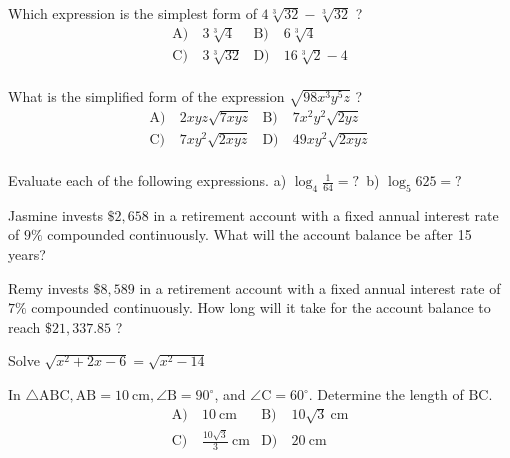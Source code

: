 \begin{problem}\label{Alg2-32}
 Which expression is the simplest form of $4 \sqrt[3]{32}-\sqrt[3]{32}$ ?
\begin{align*}
\text{A)}\ & 3 \sqrt[3]{4} &
\text{B)}\ &  6 \sqrt[3]{4}\\
\text{C)}\ & 3 \sqrt[3]{32} &
\text{D)}\ & 16 \sqrt[3]{2}-4\\
\end{align*}    
\end{problem}


\begin{problem}\label{Alg2-33}
What is the simplified form of the expression $\sqrt{98 x^{3} y^{5} z}$ ?
\begin{align*}
\text{A)}\ & 2 x y z \sqrt{7 x y z} &
\text{B)}\ &  7 x^{2} y^{2} \sqrt{2 y z}
\\
\text{C)}\ & 7 x y^{2} \sqrt{2 x y z}  &
\text{D)}\ &49 x y^{2} \sqrt{2 x y z} \\
\end{align*}    
\end{problem}



\begin{problem}\label{Alg2-37}
Evaluate each of the following expressions.
a) $\log _{4} \frac{1}{64}=? $\ 
b) $\log _{5} 625=? $
\end{problem}



\begin{problem}\label{Alg2-41}
Jasmine invests $\$ 2,658$ in a retirement account with a fixed annual interest rate of $9 \%$ compounded continuously. What will the account balance be after 15 years?   
\end{problem}


\begin{problem}\label{Alg2-42}
Remy invests $\$ 8,589$ in a retirement account with a fixed annual interest rate of $7 \%$ compounded continuously. How long will it take for the account balance to reach $\$ 21,337.85$ ?
\end{problem}




\begin{problem}\label{Alg2-44}
Solve $\sqrt{x^{2}+2 x-6}=\sqrt{x^{2}-14}$  
\end{problem}



\begin{problem}\label{PreCal-7}
In $\triangle \mathrm{ABC}, \mathrm{AB}=10 \mathrm{~cm}, \angle \mathrm{B}=90^{\circ}$, and $\angle \mathrm{C}=60^{\circ}$. Determine the length of $\mathrm{BC}$.
\begin{align*}
\text{A)}\ & 10 \mathrm{~cm} &
\text{B)}\ &  10 \sqrt{3} \mathrm{~cm}\\
\text{C)}\ &  \frac{10 \sqrt{3}}{3} \mathrm{~cm} &
\text{D)}\ & 20 \mathrm{~cm}\\
\end{align*}    
\end{problem}


